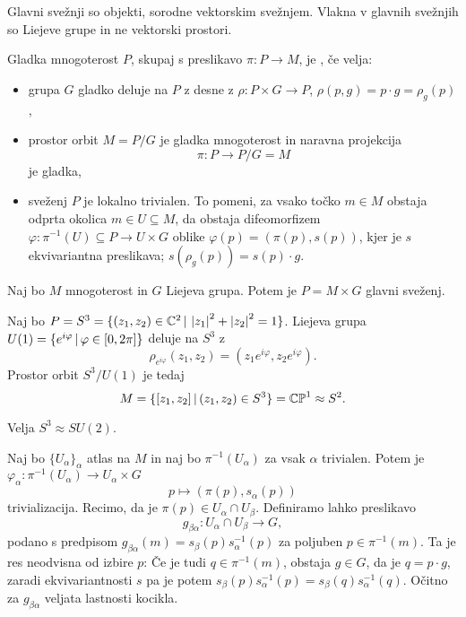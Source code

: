 
Glavni svežnji so objekti, sorodne vektorskim svežnjem.
Vlakna v glavnih svežnjih so Liejeve grupe in ne vektorski prostori.

\begin{definicija}
  Gladka mnogoterost $P$, skupaj s preslikavo $\pi: P \to M$, je , če velja:
  \begin{itemize}
  \item grupa $G$ gladko deluje na $P$ z desne z $\rho: P \times G \to P$,
	$\rho(p, g) = p \cdot g = \rho_g(p)$,
  \item prostor orbit $M = P/G$ je gladka mnogoterost in naravna projekcija
	\[
	  \pi: P \to P/G =M
	\]
	je gladka,
  \item sveženj $P$ je lokalno trivialen.
	To pomeni, za vsako točko $m \in M$ obstaja odprta okolica $m \in U
	\subseteq M$, da obstaja difeomorfizem $\varphi: \pi^{-1}(U) \subseteq P \to
	U \times G$ oblike $\varphi(p) = (\pi(p), s(p))$, kjer je $s$ ekvivariantna
	preslikava; $s(\rho_g(p)) = s(p) \cdot g$.
  \end{itemize}
\end{definicija}

\begin{primer}
  Naj bo $M$ mnogoterost in $G$ Liejeva grupa.
  Potem je $P = M \times G$ glavni sveženj.
\end{primer}

\begin{primer}
  Naj bo $P = S^3 = \{ (z_1, z_2) \in \mathbb{C}^2 \,|\, \left| z_1 \right|^2 + \left| z_2 \right|^2 = 1
  \}$.
  Liejeva grupa $U(1) = \{ e^{i \varphi} \,|\, \varphi \in [0, 2 \pi] \}$ deluje
  na $S^3$ z
  \[
	\rho_{e^{i \varphi}} (z_1, z_2) = (z_1 e^{i \varphi}, z_2 e^{i \varphi}).
  \]
  Prostor orbit $S^3 / U(1)$ je tedaj
  \[
	M = \{ [z_1, z_2] \,|\, (z_1, z_2) \in S^3 \}
	= \mathbb{CP}^{1} \approx S^2.
  \]
\end{primer}

\begin{opomba}
  Velja $S^3 \approx SU(2)$.
\end{opomba}

Naj bo $\{U_\alpha\}_\alpha$ atlas na $M$ in naj bo $\pi^{-1}(U_\alpha)$ za vsak
$\alpha$ trivialen.
Potem je $\varphi_\alpha: \pi^{-1}(U_\alpha) \to U_\alpha \times G$
\[
  p \mapsto (\pi(p), s_\alpha(p))
\]
trivializacija.
Recimo, da je $\pi(p) \in U_\alpha \cap U_\beta$.
Definiramo lahko preslikavo
\[
  g_{\beta \alpha}: U_\alpha \cap U_\beta \to G,
\]
podano s predpisom $g_{\beta \alpha}(m) = s_\beta(p) s_\alpha^{-1}(p)$ za
poljuben $p \in \pi^{-1}(m)$.
Ta je res neodvisna od izbire $p$:
Če je tudi $q \in \pi^{-1}(m)$, obstaja $g \in G$, da je $q = p \cdot g$, zaradi
ekvivariantnosti $s$ pa je potem $s_\beta(p) s_{\alpha}^{-1}(p) = s_\beta(q)
s_\alpha^{-1}(q)$.
Očitno za $g_{\beta \alpha}$ veljata lastnosti kocikla.

